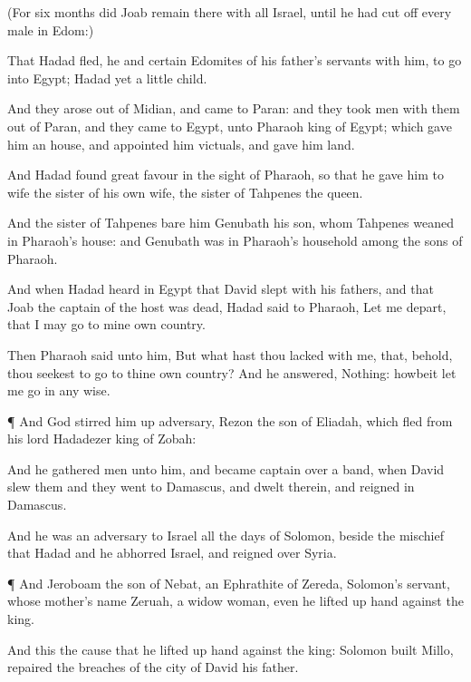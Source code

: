 {(For
six
months did
Joab
remain there with all
Israel, until he had cut
off every
male in
Edom:)

That
Hadad
fled, he and
certain
Edomites of his
father’s
servants with him, to
go into
Egypt;
Hadad
{} yet a
little
child.

And they
arose out of
Midian, and
came to
Paran: and they
took
men with them out of
Paran, and they
came to
Egypt, unto
Pharaoh
king of
Egypt; which
gave him an
house, and
appointed him
victuals, and
gave him
land.

And
Hadad
found
great
favour in the
sight of
Pharaoh, so that he
gave him to
wife the
sister of his own
wife, the
sister of
Tahpenes the
queen.

And the
sister of
Tahpenes
bare him
Genubath his
son, whom
Tahpenes
weaned
in
Pharaoh’s
house: and
Genubath was in
Pharaoh’s
household
among the
sons of
Pharaoh.

And when
Hadad
heard in
Egypt that
David
slept with his
fathers, and that
Joab the
captain of the
host was
dead,
Hadad
said to
Pharaoh, Let me
depart, that I may
go to mine own
country.

Then
Pharaoh
said unto him, But what hast thou
lacked with me, that, behold, thou
seekest to
go to thine own
country? And he
answered, Nothing: howbeit let me
go in any
wise.


\par }{\PP {}¶ And
God stirred him
up
{}
adversary,
Rezon the
son of
Eliadah, which
fled from his
lord
Hadadezer
king of
Zobah:

And he
gathered
men unto him, and became
captain over a
band, when
David
slew them
{} and they
went to
Damascus, and
dwelt therein, and
reigned in
Damascus.

And he was an
adversary to
Israel all the
days of
Solomon, beside the
mischief that
Hadad
{} and he
abhorred
Israel, and
reigned over
Syria.


\par }{\PP {}¶ And
Jeroboam the
son of
Nebat, an
Ephrathite of
Zereda,
Solomon’s
servant, whose
mother’s
name
{}
Zeruah, a
widow
woman, even he lifted
up
{}
hand against the
king.

And this
{} the
cause that he lifted
up
{}
hand against the
king:
Solomon
built
Millo,
{}
repaired the
breaches of the
city of
David his
father.

}
